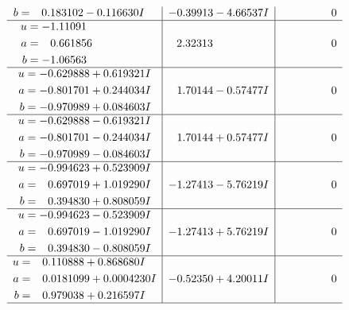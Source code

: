 \documentclass[1p]{elsarticle_modified}
\theoremstyle{definition}
\begin{document}
$$\begin{array}{c|c|c}
\begin{aligned}
b &= \phantom{-}0.183102 - 0.116630 I\end{aligned}
 & -0.39913 - 4.66537 I & \phantom{-0.000000 } 0 \\ \hline\begin{aligned}
u &= -1.11091\phantom{ +0.000000I} \\
a &= \phantom{-}0.661856\phantom{ +0.000000I} \\
b &= -1.06563\phantom{ +0.000000I}\end{aligned}
 & \phantom{-}2.32313\phantom{ +0.000000I} & \phantom{-0.000000 } 0 \\ \hline\begin{aligned}
u &= -0.629888 + 0.619321 I \\
a &= -0.801701 + 0.244034 I \\
b &= -0.970989 + 0.084603 I\end{aligned}
 & \phantom{-}1.70144 - 0.57477 I & \phantom{-0.000000 } 0 \\ \hline\begin{aligned}
u &= -0.629888 - 0.619321 I \\
a &= -0.801701 - 0.244034 I \\
b &= -0.970989 - 0.084603 I\end{aligned}
 & \phantom{-}1.70144 + 0.57477 I & \phantom{-0.000000 } 0 \\ \hline\begin{aligned}
u &= -0.994623 + 0.523909 I \\
a &= \phantom{-}0.697019 + 1.019290 I \\
b &= \phantom{-}0.394830 + 0.808059 I\end{aligned}
 & -1.27413 - 5.76219 I & \phantom{-0.000000 } 0 \\ \hline\begin{aligned}
u &= -0.994623 - 0.523909 I \\
a &= \phantom{-}0.697019 - 1.019290 I \\
b &= \phantom{-}0.394830 - 0.808059 I\end{aligned}
 & -1.27413 + 5.76219 I & \phantom{-0.000000 } 0 \\ \hline\begin{aligned}
u &= \phantom{-}0.110888 + 0.868680 I \\
a &= \phantom{-}0.0181099 + 0.0004230 I \\
b &= \phantom{-}0.979038 + 0.216597 I\end{aligned}
 & -0.52350 + 4.20011 I & \phantom{-0.000000 } 0\\
 \hline 
 \end{array}$$\newpage$$\begin{array}{c|c|c}  

\end{array}$$
\end{document}
